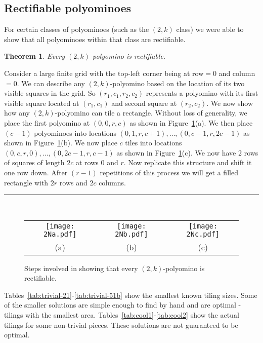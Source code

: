 \documentclass[10pt,a4paper]{article}
\newcommand{\BlackBox}{\rule{1.5ex}{1.5ex}}  \fi
\newenvironment{proof}{\par\noindent{\bf Proof\ }}{\hfill\BlackBox\\[2mm]}
\newtheorem{theorem}{Theorem}
\theoremstyle{definition}
\begin{document}
\pagebreak
\subsection{Rectifiable polyominoes}

For certain classes of polyominoes (such as the $(2,k)$ class) we were able to show that all polyominoes within that class are rectifiable.

\begin{theorem}
Every $(2,k)$-polyomino is rectifiable.
\end{theorem}
\begin{proof}
Consider a large finite grid with the top-left corner being at row$=0$ and column$=0$. We can describe any 
$(2,k)$-polyomino based on the location of its two visible squares in the grid. So $(r_1,c_1,r_2,c_2)$ represents
a polyomino with its first visible square located at $(r_1,c_1)$ and second square at $(r_2,c_2)$.
We now show how any $(2,k)$-polyomino can tile a rectangle. Without loss of generality, we place the first
polyomino at $(0,0,r,c)$ as shown in Figure~\ref{fig:2N}(a). We then place $(c-1)$ polyominoes into locations
$(0,1,r,c+1), \ldots, (0,c-1,r,2c-1)$ as shown in Figure~\ref{fig:2N}(b). We now place $c$ tiles into locations
$(0,c,r,0), \ldots, (0,2c-1,r,c-1)$ as shown in Figure~\ref{fig:2N}(c). We now have 2 rows of squares of length $2c$ at
rows $0$ and $r$. Now replicate this structure and shift it one row down. After $(r-1)$ repetitions of this process
we will get a filled rectangle with $2r$ rows and $2c$ columns.
\end{proof}

\begin{figure}[!htpb]
\centering
\begin{tabular}{ccc}
\texttt{[image: 2Na.pdf]} & \texttt{[image: 2Nb.pdf]} & \texttt{[image: 2Nc.pdf]} \\
(a) & (b) & (c)
\end{tabular}
\caption{Steps involved in showing that every $(2,k)$-polyomino is rectifiable.}
\label{fig:2N}
\end{figure}

Tables~\ref{tab:trivial-21}-\ref{tab:trivial-51b} show the smallest known tiling sizes.
Some of the smaller solutions are simple enough to find by hand and are optimal - 
tilings with the smallest area.
Tables~\ref{tab:cool1}-\ref{tab:cool2} show the actual tilings for
some non-trivial pieces. These solutions are not guaranteed to be optimal.
\end{document}
